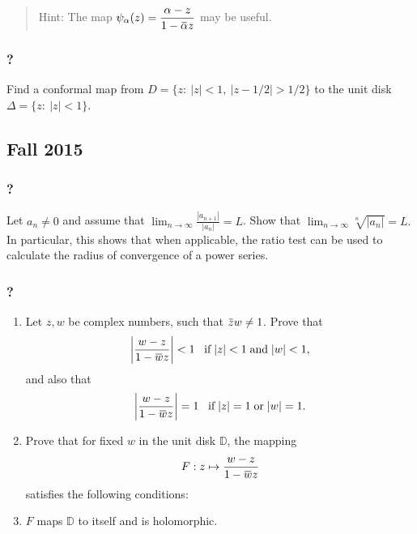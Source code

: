 \begin{quote}
Hint: The map
\(\displaystyle{\psi_{\alpha}(z)=\frac{\alpha-z}{1-\mkern 1.5mu\overline{\mkern-1.5mu\alpha\mkern-1.5mu}\mkern 1.5muz}}\)
may be useful.
\end{quote}

\hypertarget{section-138}{%
\subsubsection{?}\label{section-138}}

Find a conformal map from \(D = \{z :\  |z| < 1,\ |z - 1/2| > 1/2\}\) to
the unit disk \(\Delta=\{z: \ |z|<1\}\).

\hypertarget{fall-2015}{%
\subsection{Fall 2015}\label{fall-2015}}

\hypertarget{section-139}{%
\subsubsection{?}\label{section-139}}

Let \(a_n \neq 0\) and assume that
\(\displaystyle \lim_{n \rightarrow \infty} \frac{|a_{n+1}|}{|a_n|} = L\).
Show that
\(\displaystyle \lim_{n \rightarrow \infty} \sqrt[n]{|a_n|} = L. %
\) In particular, this shows that when applicable, the ratio test can be
used to calculate the radius of convergence of a power series.

\hypertarget{section-140}{%
\subsubsection{?}\label{section-140}}

\begin{enumerate}
\def\labelenumi{(\alph{enumi})}
\item
  Let \(z, w\) be complex numbers, such that
  \(\mkern 1.5mu\overline{\mkern-1.5muz\mkern-1.5mu}\mkern 1.5mu w \neq 1\).
  Prove that
  \begin{align*}{\left\lvert {\frac{w - z}{1 - \mkern 1.5mu\overline{\mkern-1.5muw\mkern-1.5mu}\mkern 1.5mu z}} \right\rvert} < 1 \; \; \; \mbox{if} \; |z| < 1 \; \mbox{and}\; |w| < 1,\end{align*}
  and also that
  \begin{align*}{\left\lvert {\frac{w - z}{1 - \mkern 1.5mu\overline{\mkern-1.5muw\mkern-1.5mu}\mkern 1.5mu z}} \right\rvert} = 1 \; \; \; \mbox{if} \; |z| = 1 \; \mbox{or}\; |w| = 1.\end{align*}
\item
  Prove that for fixed \(w\) in the unit disk \(\mathbb D\), the mapping
  \begin{align*}F: z \mapsto \frac{w - z}{1 - \mkern 1.5mu\overline{\mkern-1.5muw\mkern-1.5mu}\mkern 1.5mu z}\end{align*}
  satisfies the following conditions:
\item
  \(F\) maps \(\mathbb D\) to itself and is holomorphic.~
\end{enumerate}

